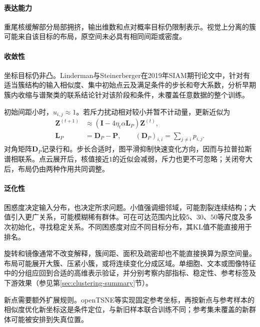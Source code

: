 \paragraph{表达能力}
重尾核缓解部分局部拥挤，输出维数和点对概率目标仍限制表示。视觉上分离的簇可能来自该目标的布局，原空间未必具有相同间距或密度。

\paragraph{收敛性}

坐标目标仍非凸。Linderman与Steinerberger在2019年SIAM期刊论文中，针对有适当簇结构的输入相似度、集中初始点云及满足条件的步长和夸大系数，分析早期簇内收缩与谱聚类的联系结论针对该阶段和条件，未覆盖任意数据的整个训练。

初始间距小时，$u_{i,j}\approx1$。若斥力扰动相对较小并暂不计动量，更新近似为
\begin{equation}
  \label{eq:dim-tsne-spectral-approximation}
  \begin{aligned}
    \bm{Z}^{(t+1)}
      &\approx(\bm{I}-4\eta_t\alpha\bm{L}_{P})\bm{Z}^{(t)},\\
    \bm{L}_{P}&=\bm{D}_{P}-\bm{P},\qquad
    (\bm{D}_{P})_{i,i}=\sum_{j\ne i}p_{i,j}.
  \end{aligned}
\end{equation}
对角矩阵$\bm{D}_{P}$记录行和。步长合适时，图平滑抑制快速变化方向，因而与拉普拉斯谱相联系。点云展开后，核值接近$1$的近似会减弱，斥力也更不可忽略；关闭夸大后，布局仍由两种作用共同调整。

\paragraph{泛化性}

困惑度决定输入分布，也决定所求问题。小值强调细邻域，可能割裂连续结构；大值引入更广关系，可能模糊稀有群体。可在可达范围内比较$5$、$30$、$50$等尺度及多次初始化，寻找稳定关系。不同困惑度对应不同目标分布，其KL值不能直接用于排名。

旋转和镜像通常不改变解释，簇间距、面积及疏密却也不能直接换算为原空间量。布局可能展开大簇、压紧小簇，或将连续变化分成区域。单细胞、文本或图像特征中的分组应回到合适的高维表示验证，并分别考察内部指标、稳定性、参考标签及下游效果（参见第\ref{sec:clustering-summary}节）。

新点需要额外扩展规则。openTSNE等实现固定参考坐标，再按新点与参考样本的相似度优化新坐标这是条件定位，与新旧样本联合训练不同；参考集未覆盖的新群体可能被安排到失真位置。

